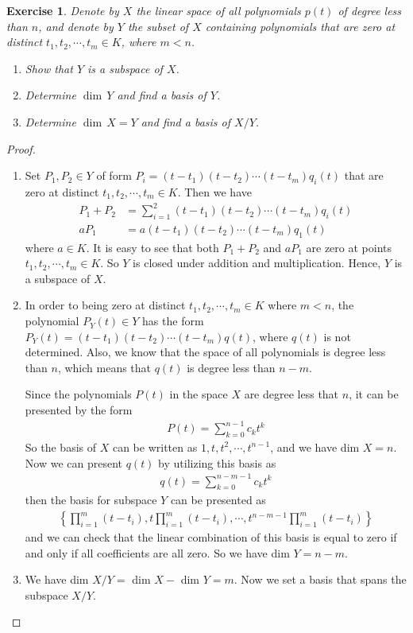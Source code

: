 \documentclass[11pt]{book}
\newtheorem{exercise}{Exercise}[section]
\theoremstyle{definition}
\numberwithin{equation}{chapter}
\begin{document}
\medskip

\begin{exercise}\label{ex_4}
Denote by $X$ the linear space of all polynomials $p(t)$ of degree less than $n$, and denote by $Y$ the subset of $X$ containing polynomials that are zero at distinct $t_1,t_2,\cdots,t_m\in K$, where $m < n$.
\begin{enumerate}[label=(\alph*)]
    \item Show that $Y$ is a subspace of $X$.
    \item Determine $ \dim \,Y$ and find a basis of $Y$.
    \item Determine $ \dim \,X = Y$ and find a basis of $X/Y$.
\end{enumerate}
\end{exercise}
\begin{proof}
~\begin{enumerate}[label=(\alph*)]
    \item Set $P_1, P_2 \in Y$ of form $P_i = (t-t_1)(t-t_2) \cdots (t-t_m)q_i(t)$ that are zero at distinct $t_1, t_2, \cdots, t_m\in K$. Then we have 
    \begin{align*}
        P_1 + P_2 &= \sum^2_{i=1}(t-t_1)(t-t_2) \cdots (t-t_m)q_i(t) \\
        a P_1 &= a (t-t_1)(t-t_2) \cdots (t-t_m)q_1(t)
    \end{align*}
    where $a \in K$. It is easy to see that both $P_1 + P_2$ and $a P_1$ are zero at points $t_1, t_2, \cdots, t_m\in K$. So $Y$ is closed under addition and multiplication. Hence, $Y$ is a subspace of $X$.
    \item In order to being zero at distinct $t_1, t_2, \cdots, t_m\in K$ where $m < n$, the polynomial $P_Y(t) \in Y$ has the form $P_Y(t) = (t-t_1)(t-t_2) \cdots (t-t_m)q(t)$, where $q(t)$ is not determined. Also, we know that the space of all polynomials is degree less than $n$, which means that $q(t)$ is degree less than $n-m$.
    
    Since the polynomials $P(t)$ in the space $X$ are degree less that $n$, it can be presented by the form
    \begin{align*}
        P(t) = \sum^{n-1}_{k=0} c_k t^k
    \end{align*}
    So the basis of $X$ can be written as ${1, t, t^2,\cdots, t^{n-1}}$, and we have dim $X = n$. Now we can present $q(t)$ by utilizing this basis as 
    \begin{align*}
        q(t) = \sum^{n-m-1}_{k=0} c_k t^k
    \end{align*}
    then the basis for subspace $Y$ can be presented as
    \begin{align*}
        \left\{ \prod^m_{i=1}(t-t_i), t\prod^m_{i=1}(t-t_i),\cdots, t^{n-m-1}\prod^m_{i=1}(t-t_i) \right\}
    \end{align*}
    and we can check that the linear combination of this basis is equal to zero if and only if all coefficients are all zero. So we have dim $Y = n-m$.
    \item We have dim $X/Y =$ dim $X -$ dim $Y = m$. Now we set a basis that spans the subspace $X/Y$.
    

\end{enumerate}
\end{proof}
\end{document}
